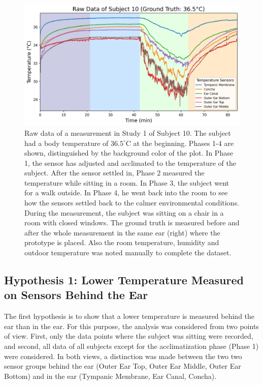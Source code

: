 \begin{figure}[!t]
    \centering
    \includegraphics[width=\textwidth]{thesis-doc/images/study1/Logging_person_10_0smoothed_raw_data.png}
    \caption{Raw data of a measurement in Study 1 of Subject 10. The subject had a body temperature of $36.5^\circ\text{C}$ at the beginning. Phases 1-4 are shown, distinguished by the background color of the plot. In Phase 1, the sensor has adjusted and acclimated to the temperature of the subject. After the sensor settled in, Phase 2 measured the temperature while sitting in a room. In Phase 3, the subject went for a walk outside. In Phase 4, he went back into the room to see how the sensors settled back to the calmer environmental conditions. During the measurement, the subject was sitting on a chair in a room with closed windows. The ground truth is measured before and after the whole measurement in the same ear (right) where the prototype is placed. Also the room temperature, humidity and outdoor temperature was noted manually to complete the dataset.}
    \label{fig:ch:Evaluation:Study1:RawData}
\end{figure}

\subsection{Hypothesis 1: Lower Temperature Measured on Sensors Behind the Ear}
\label{subsec:Evaluation:Study1:Hypothesis1}

The first hypothesis is to show that a lower temperature is measured behind the ear than in the ear.
For this purpose, the analysis was considered from two points of view. 
First, only the data points where the subject was sitting were recorded, and second, all data of all subjects except for the acclimatization phase (Phase 1) were considered.
In both views, a distinction was made between the two two sensor groups behind the ear (Outer Ear Top, Outer Ear Middle, Outer Ear Bottom) and in the ear (Tympanic Membrane, Ear Canal, Concha). 

